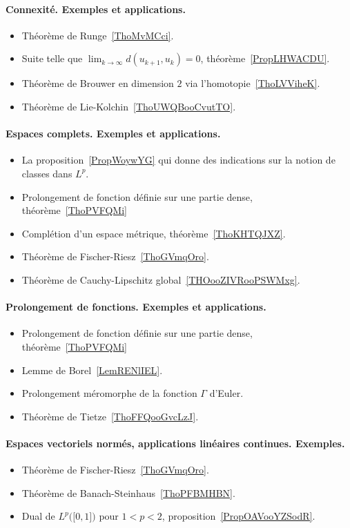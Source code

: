 \paragraph{Connexité. Exemples et applications.}
\begin{itemize}
    \item Théorème de Runge~\ref{ThoMvMCci}.
    \item Suite telle que \( \lim_{k\to \infty} d(u_{k+1},u_k)=0\), théorème~\ref{PropLHWACDU}.
    \item Théorème de Brouwer en dimension \( 2\) via l'homotopie~\ref{ThoLVViheK}.
    \item Théorème de Lie-Kolchin~\ref{ThoUWQBooCvutTO}.
\end{itemize}
\paragraph{Espaces complets. Exemples et applications.}
\begin{itemize}
    \item La proposition~\ref{PropWoywYG} qui donne des indications sur la notion de classes dans \( L^p\).
    \item Prolongement de fonction définie sur une partie dense, théorème~\ref{ThoPVFQMi}
    \item Complétion d'un espace métrique, théorème~\ref{ThoKHTQJXZ}.
    \item Théorème de Fischer-Riesz~\ref{ThoGVmqOro}.
    \item Théorème de Cauchy-Lipschitz global~\ref{THOooZIVRooPSWMxg}.
\end{itemize}
\paragraph{Prolongement de fonctions. Exemples et applications.}
\begin{itemize}
    \item Prolongement de fonction définie sur une partie dense, théorème~\ref{ThoPVFQMi}
    \item Lemme de Borel~\ref{LemRENlIEL}.
    \item Prolongement méromorphe de la fonction \( \Gamma\) d'Euler.
    \item Théorème de Tietze~\ref{ThoFFQooGvcLzJ}.
\end{itemize}
\paragraph{Espaces vectoriels normés, applications linéaires continues. Exemples.}
\begin{itemize}
    \item Théorème de Fischer-Riesz~\ref{ThoGVmqOro}.
    \item Théorème de Banach-Steinhaus~\ref{ThoPFBMHBN}.
    \item Dual de \( L^p\big( \mathopen[ 0 , 1 \mathclose] \big)\) pour \( 1<p<2\), proposition~\ref{PropOAVooYZSodR}.
\end{itemize}


